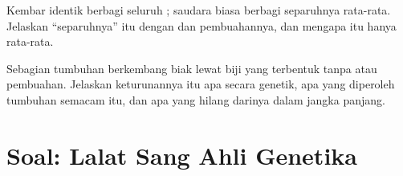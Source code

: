 \begin{exercise}[$\star\star\star$]\label{exo:g12:meiosis-genetic-shuffling:14}
Kembar identik berbagi seluruh ; saudara biasa berbagi
separuhnya rata-rata. Jelaskan ``separuhnya'' itu dengan  dan
pembuahannya, dan mengapa itu hanya rata-rata.
\end{exercise}

\begin{exercise}[$\star\star\star$]\label{exo:g12:meiosis-genetic-shuffling:15}
Sebagian tumbuhan berkembang biak lewat biji yang terbentuk tanpa
 atau pembuahan. Jelaskan keturunannya itu apa secara genetik,
apa yang diperoleh tumbuhan semacam itu, dan apa yang hilang darinya
dalam jangka panjang.
\end{exercise}

\section{Soal: Lalat Sang Ahli Genetika}

